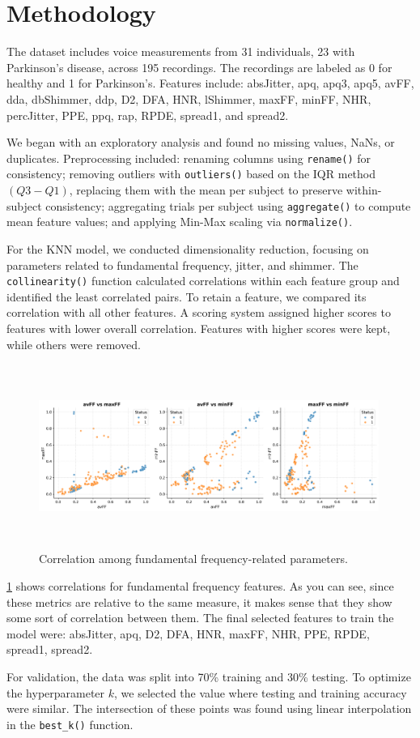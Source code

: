\section{Methodology}

The dataset includes voice measurements from 31 individuals, 23 with
Parkinson's disease, across 195 recordings. The recordings are labeled as 0 for
healthy and 1 for Parkinson's. Features include: absJitter, apq, apq3, apq5,
avFF, dda, dbShimmer, ddp, D2, DFA, HNR, lShimmer, maxFF, minFF, NHR,
percJitter, PPE, ppq, rap, RPDE, spread1, and spread2.

We began with an exploratory analysis and found no missing values, NaNs, or
duplicates. Preprocessing included: renaming columns using \texttt{rename()}
for consistency; removing outliers with \texttt{outliers()} based on the IQR
method \((Q3 - Q1)\), replacing them with the mean per subject to preserve
within-subject consistency; aggregating trials per subject using
\texttt{aggregate()} to compute mean feature values; and applying Min-Max
scaling via \texttt{normalize()}.

For the KNN model, we conducted dimensionality reduction, focusing on
parameters related to fundamental frequency, jitter, and shimmer. The
\texttt{collinearity()} function calculated correlations within each feature
group and identified the least correlated pairs. To retain a feature, we
compared its correlation with all other features. A scoring system assigned
higher scores to features with lower overall correlation. Features with higher
scores were kept, while others were removed.

\begin{figure}[H]
	\centering
	\includegraphics[width=0.99\textwidth,height=6cm]{../images/feature_selection/fundamental_frequency.png}
	\caption{Correlation among fundamental frequency-related parameters.}
	\label{fig:fig2}
\end{figure}

\cref{fig:fig2} shows correlations for fundamental frequency features. As you
can see, since these metrics are relative to the same measure, it makes sense
that they show some sort of correlation between them. The final selected
features to train the model were: absJitter, apq, D2, DFA, HNR, maxFF, NHR,
PPE, RPDE, spread1, spread2.

For validation, the data was split into 70\% training and 30\% testing. To
optimize the hyperparameter \(k\), we selected the value where testing and
training accuracy were similar. The intersection of these points was found
using linear interpolation in the \texttt{best\_k()} function.
